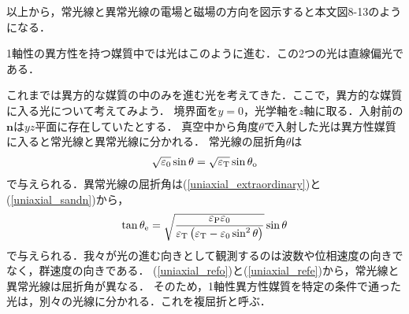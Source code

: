 以上から，常光線と異常光線の電場と磁場の方向を図示すると本文図8-13のようになる．

1軸性の異方性を持つ媒質中では光はこのように進む．この2つの光は直線偏光である．

これまでは異方的な媒質の中のみを進む光を考えてきた．ここで，異方的な媒質に入る光について考えてみよう．
境界面を$y=0$，光学軸を$z$軸に取る．入射前の$\boldsymbol{n}$は$yz$平面に存在していたとする．
真空中から角度$\theta$で入射した光は異方性媒質に入ると常光線と異常光線に分かれる．
常光線の屈折角$\theta$は
\begin{align}
  \sqrt{\varepsilon_0}\sin\theta=\sqrt{\varepsilon_{\text T}}\sin\theta_{\text o}\label{uniaxial_refo}
\end{align}
で与えられる．異常光線の屈折角は(\ref{uniaxial_extraordinary})と(\ref{uniaxial_sandn})から，
\begin{align}
  \tan\theta_{\text e}=\sqrt{\dfrac{\varepsilon_{\text P}\varepsilon_0}{\varepsilon_{\text T}\left(\varepsilon_{\text T}-\varepsilon_0\sin^2\theta\right)}}\sin\theta\label{uniaxial_refe}
\end{align}
で与えられる．我々が光の進む向きとして観測するのは波数や位相速度の向きでなく，群速度の向きである．
(\ref{uniaxial_refo})と(\ref{uniaxial_refe})から，常光線と異常光線は屈折角が異なる．
そのため，1軸性異方性媒質を特定の条件で通った光は，別々の光線に分かれる．これを複屈折と呼ぶ．

